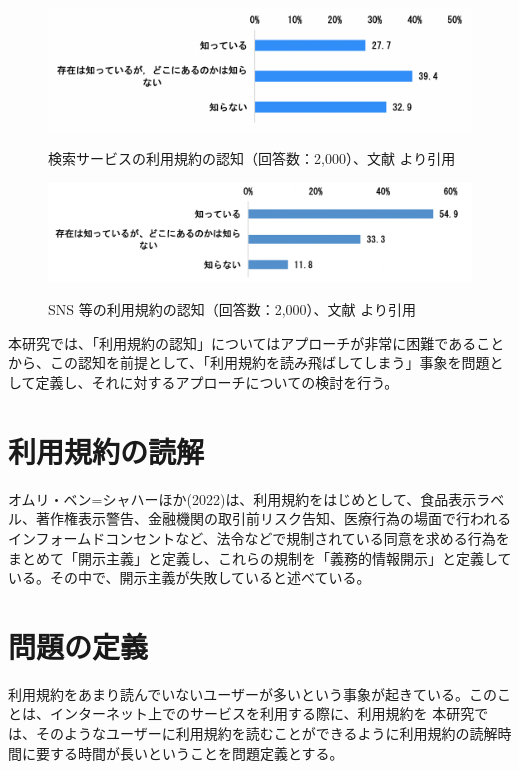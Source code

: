 \begin{figure}[h]
  \begin{center}
      \includegraphics[width=13cm]{img/searchtosninchi.png}
      \caption{検索サービスの利用規約の認知（回答数：2,000）、文献\cite{jftc2021} より引用}
      \label{img:searchtosninchi}
      \includegraphics[width=13cm]{img/snstosninchi.png}
      \caption{SNS 等の利用規約の認知（回答数：2,000）、文献\cite{jftc2021}  より引用}
      \label{img:snstosninchi}
  \end{center}
\end{figure}

本研究では、「利用規約の認知」についてはアプローチが非常に困難であることから、この認知を前提として、「利用規約を読み飛ばしてしまう」事象を問題として定義し、それに対するアプローチについての検討を行う。

\section{利用規約の読解}
オムリ・ベン=シャハーほか(2022)\cite{sonokiyaku2022}は、利用規約をはじめとして、食品表示ラベル、著作権表示警告、金融機関の取引前リスク告知、医療行為の場面で行われるインフォームドコンセントなど、法令などで規制されている同意を求める行為をまとめて「開示主義」と定義し、これらの規制を「義務的情報開示」と定義している。その中で、開示主義が失敗していると述べている。

\section{問題の定義}
利用規約をあまり読んでいないユーザーが多いという事象が起きている。このことは、インターネット上でのサービスを利用する際に、利用規約を
本研究では、そのようなユーザーに利用規約を読むことができるように利用規約の読解時間に要する時間が長いということを問題定義とする。